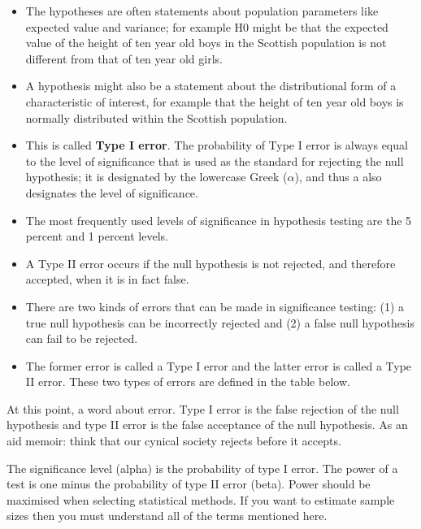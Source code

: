 \begin{itemize}
\item The hypotheses are often statements about population parameters like expected value and variance; for example H0 might be that the expected value of the height of ten year old boys in the Scottish population is not different from that of ten year old girls.
\item  A hypothesis might also be a statement about the distributional form of a characteristic of interest, for example that the height of ten year old boys is normally distributed within the Scottish population.

\item This is called \textbf{Type I error}. The probability of Type I error is always equal to the level of significance that is used as the standard for rejecting the null hypothesis; it is designated by the
lowercase Greek  ($\alpha$), and thus a also designates the level of significance. 

\item The most frequently used levels of significance in hypothesis testing are the 5 percent and 1 percent levels.

\item A Type II error occurs if the null hypothesis is not rejected, and therefore accepted, when it is in fact false.

\item There are two kinds of errors that can be made in significance testing: (1) a true null hypothesis can be incorrectly rejected and (2) a false null hypothesis can fail to be rejected. 

\item The former error is called a Type I error and the latter error is called a Type II error. These two types of errors are defined in the table below. 
\end{itemize}





At this point, a word about error. Type I error is the false rejection of the null hypothesis and type II error is the false acceptance of the null hypothesis. As an aid memoir: think that our cynical society rejects before it accepts.

The significance level (alpha) is the probability of type I error. The power of a test is one minus the probability of type II error (beta). Power should be maximised when selecting statistical methods. If you want to estimate sample sizes then you must understand all of the terms mentioned here.

